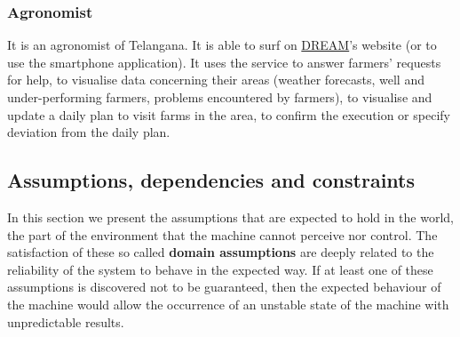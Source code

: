 \subsubsection*{Agronomist}
It is an agronomist of Telangana. It is able to surf on \hyperref[tab:acronymsTable]{DREAM}’s website (or to use the smartphone application). It uses the service to answer farmers' requests for help, to visualise data concerning their areas (weather forecasts, well and under-performing farmers, problems encountered by farmers), to visualise and update a daily plan to visit farms in the area, to confirm the execution or specify deviation from the daily plan.

\newpage

\subsection{Assumptions, dependencies and constraints}
\label{sec:domain_assumptions}
In this section we present the assumptions that are expected to hold in the world, the part of the environment that the machine cannot perceive nor control. The satisfaction of these so called \textbf{domain assumptions} are deeply related to the reliability of the system to behave in the expected way. If at least one of these assumptions is discovered not to be guaranteed, then the expected behaviour of the machine would allow the occurrence of an unstable state of the machine with unpredictable results.
\newline

